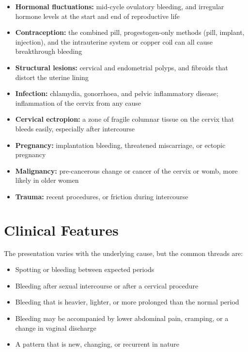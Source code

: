 \begin{itemize}
    \item \textbf{Hormonal fluctuations:} mid-cycle ovulatory bleeding, and irregular hormone levels at the start and end of reproductive life
    \item \textbf{Contraception:} the combined pill, progestogen-only methods (pill, implant, injection), and the intrauterine system or copper coil can all cause breakthrough bleeding
    \item \textbf{Structural lesions:} cervical and endometrial polyps, and fibroids that distort the uterine lining
    \item \textbf{Infection:} chlamydia, gonorrhoea, and pelvic inflammatory disease; inflammation of the cervix from any cause
    \item \textbf{Cervical ectropion:} a zone of fragile columnar tissue on the cervix that bleeds easily, especially after intercourse
    \item \textbf{Pregnancy:} implantation bleeding, threatened miscarriage, or ectopic pregnancy
    \item \textbf{Malignancy:} pre-cancerous change or cancer of the cervix or womb, more likely in older women
    \item \textbf{Trauma:} recent procedures, or friction during intercourse
\end{itemize}

\section*{Clinical Features}
The presentation varies with the underlying cause, but the common threads are:

\begin{itemize}
    \item Spotting or bleeding between expected periods
    \item Bleeding after sexual intercourse or after a cervical procedure
    \item Bleeding that is heavier, lighter, or more prolonged than the normal period
    \item Bleeding may be accompanied by lower abdominal pain, cramping, or a change in vaginal discharge
    \item A pattern that is new, changing, or recurrent in nature
\end{itemize}

